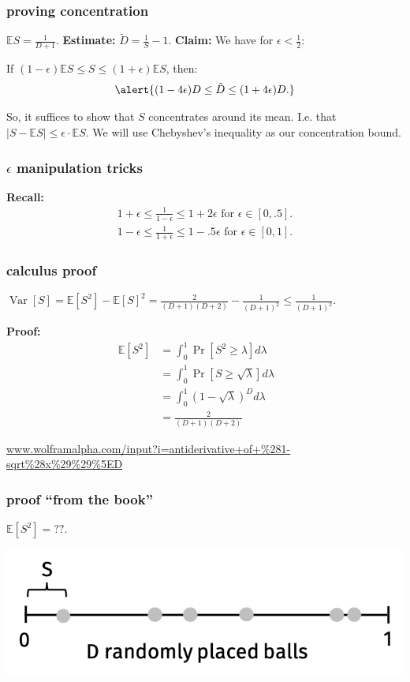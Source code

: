 \documentclass[compress]{beamer}
\newcommand{\E}{\mathbb{E}}
\DeclareMathOperator{\Var}{Var}
\begin{document}
\begin{frame}
	\frametitle{proving concentration}	
	$\E S = \frac{1}{D + 1}$. \textbf{Estimate:} $\tilde{D} = \frac{1}{S} - 1$. \textbf{Claim:} We have for $\epsilon < \frac{1}{2}$:
	
	\begin{center}
	If $(1-\epsilon)\E S \leq S \leq (1+\epsilon)\E S$, then:
	\begin{align*}
	\alert{(1-4\epsilon)D \leq \tilde{D} \leq (1+4\epsilon)D.}
	\end{align*}
	\end{center}
\vspace{10em}

	So, it suffices to show that $S$ concentrates around its mean. I.e. that $|S - \E S| \leq \epsilon\cdot\E S$. We will use Chebyshev's inequality as our concentration bound.
\end{frame}

\begin{frame}
\frametitle{$\epsilon$ manipulation tricks}
\textbf{Recall:}
\begin{align*}
	1+\epsilon \leq \frac{1}{1-\epsilon} \leq 1+ 2\epsilon \text{ for } \epsilon \in [0,.5].
\end{align*}
\begin{align*}
	1-\epsilon \leq \frac{1}{1+\epsilon} \leq 1 - .5\epsilon \text{ for } \epsilon \in [0,1].
\end{align*}
\end{frame}

\begin{frame}
	\frametitle{calculus proof}	
	\begin{lemma}
	$\Var[S] = \E [S^2] - \E[S]^2= \frac{2}{(D+1)(D+2)} - \frac{1}{(D+1)^2} \leq \frac{1}{(D+1)^2}$.
	\end{lemma}
	\textbf{Proof:} 
	\begin{align*}
	\E[S^2] &= \int_0^1 \Pr[S^2 \geq \lambda] d\lambda & &\text{} \\
	&= \int_0^1 \Pr[S \geq \sqrt{\lambda}] d\lambda & &\text{} \\
	&= \int_0^1 (1-\sqrt{\lambda})^D d\lambda & &\text{} \\
	& = \frac{2}{(D+1)(D+2)}& &\text{}
	\end{align*}
	
	\small
	\url{www.wolframalpha.com/input?i=antiderivative+of+\%281-sqrt\%28x\%29\%29\%5ED}
\end{frame}

\begin{frame}
	\frametitle{proof ``from the book''}
	$\E[S^2] = ??$.
	\begin{center}
			\includegraphics[width=.6\textwidth]{FMimage.png}
	\end{center}
\end{frame}
\end{document}
